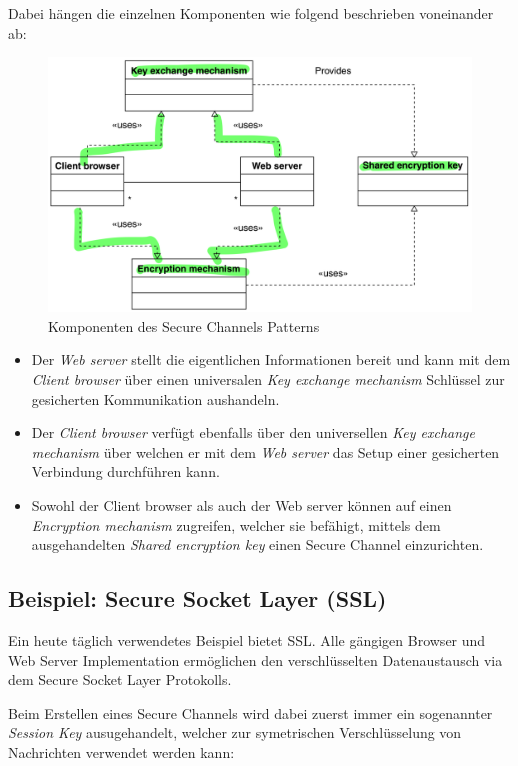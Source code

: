 Dabei hängen die einzelnen Komponenten wie folgend beschrieben voneinander ab:

\begin{figure}[H]
	\centering
	\includegraphics[width=12cm]{content/security/secure-internet-applications/images/secure-channels-overview.png}
	\caption{Komponenten des Secure Channels Patterns \cite{SecPatterns06}}
\end{figure}

\begin{itemize}
	\item Der \emph{Web server} stellt die eigentlichen Informationen bereit und kann mit dem \emph{Client browser} über einen universalen \emph{Key exchange mechanism} Schlüssel zur gesicherten Kommunikation aushandeln.
	\item Der \emph{Client browser} verfügt ebenfalls über den universellen \emph{Key exchange mechanism} über welchen er mit dem \emph{Web server} das Setup einer gesicherten Verbindung durchführen kann.
	\item Sowohl der Client browser als auch der Web server können auf einen \emph{Encryption mechanism} zugreifen, welcher sie befähigt, mittels dem ausgehandelten \emph{Shared encryption key} einen Secure Channel einzurichten.
\end{itemize}

\subsection*{Beispiel: Secure Socket Layer (SSL)}
Ein heute täglich verwendetes Beispiel bietet SSL. Alle gängigen Browser und Web Server Implementation ermöglichen den verschlüsselten Datenaustausch via dem Secure Socket Layer Protokolls.

Beim Erstellen eines Secure Channels wird dabei zuerst immer ein sogenannter \emph{Session Key} ausugehandelt, welcher zur symetrischen Verschlüsselung von Nachrichten verwendet werden kann:

